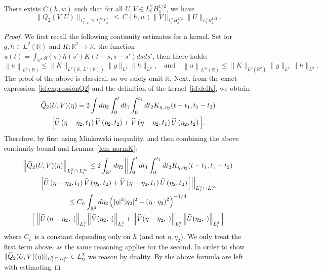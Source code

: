 \documentclass[AHL, Unicode, longabstracts,published]{cedram}
\newcommand{\R}{\mathbb{R}}
\let\oldhat\hat
\renewcommand*{\hat}[1]{\mathchoice{\widehat{#1}}{\widehat{#1}}{\oldhat{#1}}{\oldhat{#1}}}
\begin{document}
\begin{prop}\label{prop:QuadV2.2}
There exists $C(h,w)$ such that for all $U,V \in L^2_{t}H^{1/2}_x$, we have
\begin{equation} \label{bd:Q2}
\|Q_2(V,U)\|_{L^2_{t,\,x}\,\cap\,L^{\infty}_tL^2_x}\,\leq \,C(h,w) \|V\|_{L^2_{t}H^{1/2}_x} \|U\|_{L^2_{t}H^{1/2}_x}.
\end{equation}
\end{prop}


\begin{proof}
We first recall the following continuity estimates for a kernel. Set for $g,h\in L^2 (\R)$ and $K: \R^2 \rightarrow \R$, the function $u(t)= \int_{\R^2} g(s)h(s') K(t-s, s - s') dsds'$, then there holds:
\[
\left\| u \right\|_{L^2(\R)} \leq \|K\|_{L^2\left(\R,\, L^1(\R)\right)} \|g\|_{L^2}\|h\|_{L^2}, \quad \text{and} \quad \left\| u \right\|_{L^{\infty}(\R)} \leq \|K\|_{L^2\left(\R^2\right)} \|g\|_{L^2}\|h\|_{L^2}.
\]
The proof of the above is classical, so we safely omit it. Next, from the exact expression~\eqref{id:expressionQ2} and the definition of the kernel~\eqref{id:defK}, we obtain:
\begin{multline*}
\hat Q_2(U,V) (\eta) = 
2\int d\eta_2 \int_{0}^t dt_1 \int_{0}^{t_1} dt_2 K_{\eta,\,\eta_2}(t-t_1,t_1-t_2)\\ \Big[\hat U\left(\eta-\eta_2,t_1\right) \hat V\left(\eta_2,t_2\right) + \hat V\left(\eta-\eta_2,t_1\right) \hat U\left(\eta_2,t_2\right)\Big].
\end{multline*}
Therefore, by first using Minkowski inequality, and then combining the above continuity bound and Lemma~\ref{lem-normK}:
\begin{multline*}
\left\|\hat Q_2(U,V) (\eta)\right\|_{L^2_t\,\cap\, L^{\infty}_t} \leq 
2 \int_{\R^3} d\eta_2 \left\| \int_{0}^t dt_1 \int_{0}^{t_1} dt_2 K_{\eta,\eta_2}(t-t_1,t_1-t_2)\right. \\
\left.\Big[\hat U\left(\eta-\eta_2,t_1\right) \hat V\left(\eta_2,t_2\right) + \hat V\left(\eta-\eta_2,t_1\right) \hat U\left(\eta_2,t_2\right)\Big]\right\|_{L^2_t\,\cap\,L^{\infty}_t}\\
\leq C_h \int_{\R^3} d\eta_2 \left(|\eta|^2|\eta_2|^2 - \left(\eta\cdot\eta_2\right)^2\right)^{-1/4}\\
\Big[\left\|\hat U\left(\eta-\eta_2,\cdot\right)\right\|_{L^2_t}\left\| \hat V(\eta_2,\cdot)\right\|_{L^2_t} + \left\|\hat V(\eta-\eta_2,\cdot)\right\|_{L^2_t}\left\| \hat U(\eta_2,\cdot)\right\|_{L^2_t} \Big]
\end{multline*}
where $C_h$ is a constant depending only on $h$ (and not $\eta,\eta_2$). We only treat the first term above, as the same reasoning applies for the second. In order to show $\|\hat Q_2(U,V) (\eta)\|_{L^2_t\,\cap\, L^{\infty}_t}\in L^2_\eta$ we reason by duality. By the above formula are left with estimating


\end{proof}
\end{document}
